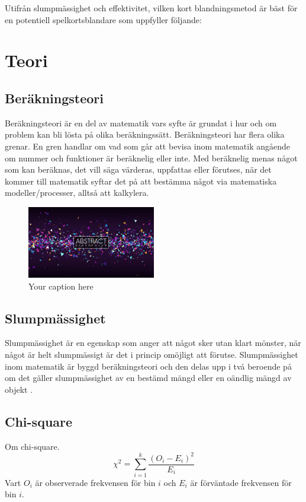 \documentclass[a4paper]{article}
\begin{document}
Utifrån slumpmässighet och effektivitet, vilken kort blandningsmetod är bäst för
en potentiell spelkortsblandare som uppfyller följande:

\section{Teori}
\subsection{Beräkningsteori}

Beräkningsteori är en del av matematik vars syfte är grundat i hur och om
problem kan bli lösta på olika beräkningssätt. Beräkningsteori har flera olika
grenar. En gren handlar om vad som går att bevisa inom matematik angående om
nummer och funktioner är beräknelig eller inte. Med beräknelig menas något som
kan beräknas, det vill säga värderas, uppfattas eller förutses, när det kommer
till matematik syftar det på att bestämma något via matematiska
modeller/processer, alltså att kalkylera.

\begin{figure}[h]
  \centering
  \includegraphics[width=0.5\textwidth]{images/test.jpg}
  \caption{Your caption here}
  \label{fig: a very cool test image}
\end{figure}

\subsection{Slumpmässighet}

Slumpmässighet är en egenskap som anger att något sker utan klart mönster, när
något är helt slumpmässigt är det i princip omöjligt att förutse. Slumpmässighet
inom matematik är byggd beräknings\-teori och den delas upp i två beroende på om
det gäller slumpmässighet av en bestämd mängd eller en oändlig mängd av objekt \parencite{Terwijn2016}.

\subsection{Chi-square}
Om chi-square.
$$ \chi^2 = \sum_{i=1}^k \frac{(O_i - E_i)^2}{E_i}$$
Vart $O_i$ är observerade frekvensen för bin $i$ och $E_i$ är förväntade frekvensen för bin $i$.
\end{document}
